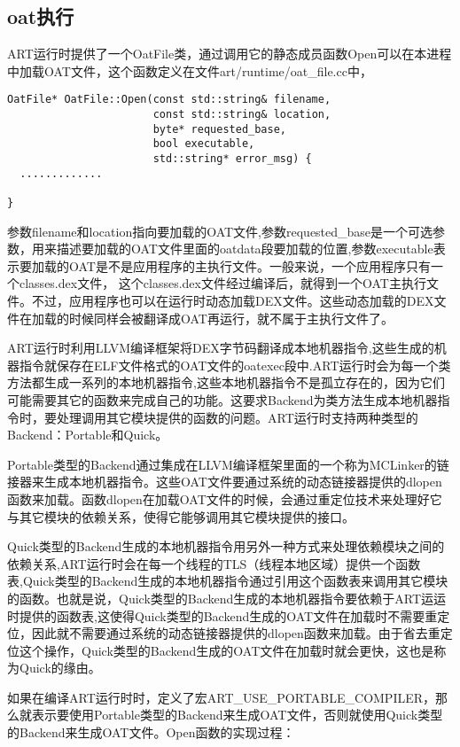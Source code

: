 \subsection{oat执行}
ART运行时提供了一个OatFile类，通过调用它的静态成员函数Open可以在本进程中加载OAT文件，这个函数定义在文件art/runtime/oat\_file.cc中，
\begin{lstlisting}
OatFile* OatFile::Open(const std::string& filename,
                       const std::string& location,
                       byte* requested_base,
                       bool executable,
                       std::string* error_msg) {
  .............

}
\end{lstlisting}
参数filename和location指向要加载的OAT文件,参数requested\_base是一个可选参数，用来描述要加载的OAT文件里面的oatdata段要加载的位置,参数executable表示要加载的OAT是不是应用程序的主执行文件。一般来说，一个应用程序只有一个classes.dex文件， 这个classes.dex文件经过编译后，就得到一个OAT主执行文件。不过，应用程序也可以在运行时动态加载DEX文件。这些动态加载的DEX文件在加载的时候同样会被翻译成OAT再运行，就不属于主执行文件了。

ART运行时利用LLVM编译框架将DEX字节码翻译成本地机器指令,这些生成的机器指令就保存在ELF文件格式的OAT文件的oatexec段中.ART运行时会为每一个类方法都生成一系列的本地机器指令,这些本地机器指令不是孤立存在的，因为它们可能需要其它的函数来完成自己的功能。这要求Backend为类方法生成本地机器指令时，要处理调用其它模块提供的函数的问题。ART运行时支持两种类型的Backend：Portable和Quick。

Portable类型的Backend通过集成在LLVM编译框架里面的一个称为MCLinker的链接器来生成本地机器指令。这些OAT文件要通过系统的动态链接器提供的dlopen函数来加载。函数dlopen在加载OAT文件的时候，会通过重定位技术来处理好它与其它模块的依赖关系，使得它能够调用其它模块提供的接口。

Quick类型的Backend生成的本地机器指令用另外一种方式来处理依赖模块之间的依赖关系,ART运行时会在每一个线程的TLS（线程本地区域）提供一个函数表,Quick类型的Backend生成的本地机器指令通过引用这个函数表来调用其它模块的函数。也就是说，Quick类型的Backend生成的本地机器指令要依赖于ART运运时提供的函数表,这使得Quick类型的Backend生成的OAT文件在加载时不需要重定位，因此就不需要通过系统的动态链接器提供的dlopen函数来加载。由于省去重定位这个操作，Quick类型的Backend生成的OAT文件在加载时就会更快，这也是称为Quick的缘由。

如果在编译ART运行时时，定义了宏ART\_USE\_PORTABLE\_COMPILER，那么就表示要使用Portable类型的Backend来生成OAT文件，否则就使用Quick类型的Backend来生成OAT文件。Open函数的实现过程：


